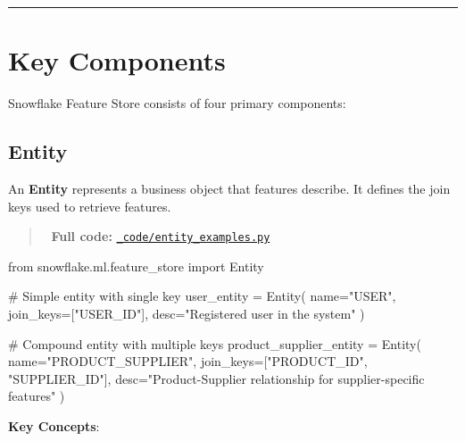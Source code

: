 \documentclass[
  letterpaper,
  DIV=11,
  numbers=noendperiod]{scrreprt}
\newenvironment{Shaded}{\begin{snugshade}}{\end{snugshade}}
\newcommand{\CommentTok}[1]{\textcolor[rgb]{0.37,0.37,0.37}{#1}}
\newcommand{\ImportTok}[1]{\textcolor[rgb]{0.00,0.46,0.62}{#1}}
\newcommand{\NormalTok}[1]{\textcolor[rgb]{0.00,0.23,0.31}{#1}}
\newcommand{\OperatorTok}[1]{\textcolor[rgb]{0.37,0.37,0.37}{#1}}
\newcommand{\StringTok}[1]{\textcolor[rgb]{0.13,0.47,0.30}{#1}}
\begin{document}
\begin{center}\rule{0.5\linewidth}{0.5pt}\end{center}

\hypertarget{key-components}{%
\section{Key Components}\label{key-components}}

Snowflake Feature Store consists of four primary components:

\hypertarget{sec-entity}{%
\subsection{Entity}\label{sec-entity}}

An \textbf{Entity} represents a business object that features describe.
It defines the join keys used to retrieve features.

\begin{quote}
📁 \textbf{Full code:}
\href{_code/entity_examples.py}{\texttt{\_code/entity\_examples.py}}
\end{quote}

\begin{Shaded}
\begin{Highlighting}[]
\ImportTok{from}\NormalTok{ snowflake.ml.feature\_store }\ImportTok{import}\NormalTok{ Entity}

\CommentTok{\# Simple entity with single key}
\NormalTok{user\_entity }\OperatorTok{=}\NormalTok{ Entity(}
\NormalTok{    name}\OperatorTok{=}\StringTok{"USER"}\NormalTok{,}
\NormalTok{    join\_keys}\OperatorTok{=}\NormalTok{[}\StringTok{"USER\_ID"}\NormalTok{],}
\NormalTok{    desc}\OperatorTok{=}\StringTok{"Registered user in the system"}
\NormalTok{)}

\CommentTok{\# Compound entity with multiple keys}
\NormalTok{product\_supplier\_entity }\OperatorTok{=}\NormalTok{ Entity(}
\NormalTok{    name}\OperatorTok{=}\StringTok{"PRODUCT\_SUPPLIER"}\NormalTok{,}
\NormalTok{    join\_keys}\OperatorTok{=}\NormalTok{[}\StringTok{"PRODUCT\_ID"}\NormalTok{, }\StringTok{"SUPPLIER\_ID"}\NormalTok{],}
\NormalTok{    desc}\OperatorTok{=}\StringTok{"Product{-}Supplier relationship for supplier{-}specific features"}
\NormalTok{)}
\end{Highlighting}
\end{Shaded}

\textbf{Key Concepts}:
\end{document}
